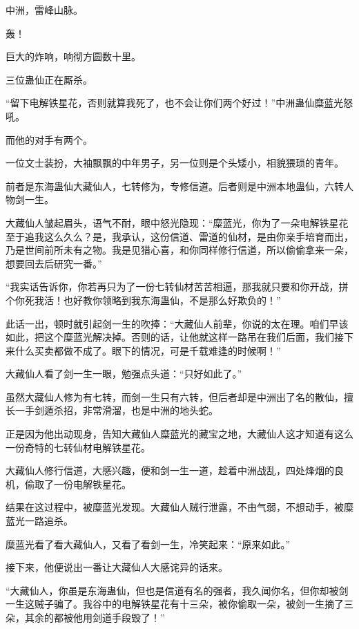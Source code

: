 
\begin{this_body}



中洲，雷峰山脉。

轰！

巨大的炸响，响彻方圆数十里。

三位蛊仙正在厮杀。

“留下电解铁星花，否则就算我死了，也不会让你们两个好过！”中洲蛊仙糜蓝光怒吼。

而他的对手有两个。

一位文士装扮，大袖飘飘的中年男子，另一位则是个头矮小，相貌猥琐的青年。

前者是东海蛊仙大藏仙人，七转修为，专修信道。后者则是中洲本地蛊仙，六转人物剑一生。

大藏仙人皱起眉头，语气不耐，眼中怒光隐现：“糜蓝光，你为了一朵电解铁星花至于追我这么久么？是，我承认，这份信道、雷道的仙材，是由你亲手培育而出，乃是世间前所未有之物。我是见猎心喜，和你同样修行信道，所以偷偷拿来一朵，想要回去后研究一番。”

“我实话告诉你，你若再只为了一份七转仙材苦苦相逼，那我就只要和你开战，拼个你死我活！也好教你领略到我东海蛊仙，不是那么好欺负的！”

此话一出，顿时就引起剑一生的吹捧：“大藏仙人前辈，你说的太在理。咱们早该如此，把这个糜蓝光解决掉。否则的话，让他就这样一路吊在我们后面，我们接下来什么买卖都做不成了。眼下的情况，可是千载难逢的时候啊！”

大藏仙人看了剑一生一眼，勉强点头道：“只好如此了。”

虽然大藏仙人修为有七转，而剑一生只有六转，但后者却是中洲出了名的散仙，擅长一手剑遁杀招，非常滑溜，也是中洲的地头蛇。

正是因为他出动现身，告知大藏仙人糜蓝光的藏宝之地，大藏仙人这才知道有这么一份奇特的七转仙材电解铁星花。

大藏仙人修行信道，大感兴趣，便和剑一生一道，趁着中洲战乱，四处烽烟的良机，偷取了一份电解铁星花。

结果在这过程中，被糜蓝光发现。大藏仙人贼行泄露，不由气弱，不想动手，被糜蓝光一路追杀。

糜蓝光看了看大藏仙人，又看了看剑一生，冷笑起来：“原来如此。”

接下来，他便说出一番让大藏仙人大感诧异的话来。

“大藏仙人，你虽是东海蛊仙，但也是信道有名的强者，我久闻你名，但你却被剑一生这贼子骗了。我谷中的电解铁星花有十三朵，被你偷取一朵，被剑一生摘了三朵，其余的都被他用剑道手段毁了！”


\end{this_body}
